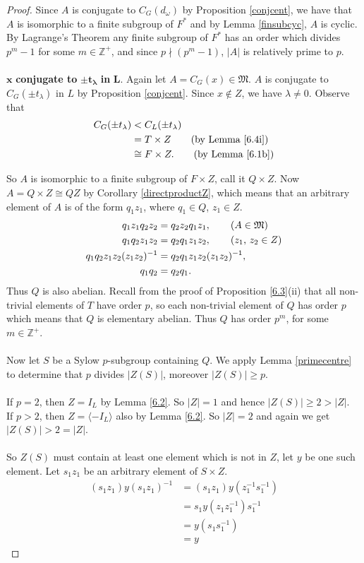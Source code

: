 \begin{proof}
Since $A$ is conjugate to $C_G(d_\omega)$ by Proposition \ref{conjcent}, we have that $A$ is isomorphic to a finite subgroup of $F^*$ and by Lemma \ref{finsubcyc}, $A$ is cyclic. By Lagrange's Theorem any finite subgroup of $F^*$ has an order which divides $p^m - 1$ for some $m \in \mathbb{Z}^+$, and since $p \nmid (p^m - 1)$, $|A|$ is relatively prime to $p$. \\
\\
 \space $\pmb{x}$ \textbf{conjugate to} $\pmb{\pm t_\lambda}$ \textbf{in} $\pmb{L}$. Again let $A = C_G(x) \in \mathfrak{M}$. $A$ is conjugate to $C_G({\pm t_\lambda})$ in $L$ by Proposition \ref{conjcent}. Since $x \notin Z$, we have $\lambda \neq 0$. Observe that
\begin{align*}  C_G({\pm t_\lambda}) &<  C_L({\pm t_\lambda})
\\&= T \times Z  \tag{by Lemma \ref{6.4i}}
\\&\cong F \times Z. \tag{by Lemma \ref{6.1b}}
\end{align*}

So $A$ is isomorphic to a finite subgroup of $F \times Z$, call it $Q \times Z$. Now $A = Q \times Z \cong QZ$ by Corollary \ref{directproductZ}, which means that an arbitrary element of $A$ is of the form $q_1z_1$, where $q_1 \in Q$, $z_1 \in Z$.
\begin{align*} q_1z_1q_2z_2 &= q_2z_2 q_1z_1, \tag{$A \in \mathfrak{M}$}
\\ q_1q_2z_1z_2 &= q_2q_1z_1z_2, \tag{$z_1$, $z_2 \in Z$}
\\  q_1q_2z_1z_2(z_1z_2)^{-1} &= q_2q_1z_1z_2(z_1z_2)^{-1},
\\ q_1q_2 &= q_2q_1.
\end{align*}
Thus $Q$ is also abelian. Recall from the proof of Proposition \ref{6.3}(ii) that all non-trivial elements of $T$ have order $p$, so each non-trivial element of $Q$ has order $p$ which means that $Q$ is elementary abelian. Thus $Q$ has order $p^m$, for some $m \in \mathbb{Z}^+$. \\
\\
Now let $S$ be a Sylow $p$-subgroup containing $Q$. We apply Lemma \ref{primecentre} to determine that $p$ divides $|Z(S)|$, moreover $|Z(S)| \geq p$. \\
\\
If $p=2$, then $Z=I_L$ by Lemma \ref{6.2}. So $|Z| = 1$ and hence $|Z(S)| \geq 2 > |Z|$.\\
If $p > 2$, then  $Z = \langle - I_L \rangle$ also by Lemma \ref{6.2}. So $|Z| = 2$ and again we get $|Z(S)| > 2 = |Z|$. \\
\\
So $Z(S)$ must contain at least one element which is not in $Z$, let $y$ be one such element. Let $s_1z_1$ be an arbitrary element of $S \times Z$.
\begin{align*}
(s_1z_1)y(s_1z_1)^{-1} &= (s_1z_1)y(z_1^{-1}s_1^{-1})
\\ &= s_1y(z_1z_1^{-1})s_1^{-1} \tag{since $y \in L$, $z_1 \in Z$}
\\ &= y(s_1s_1^{-1}) \tag{since $s_1 \in S$, $y \in Z(S)$}
\\ &= y
\end{align*}


\end{proof}
